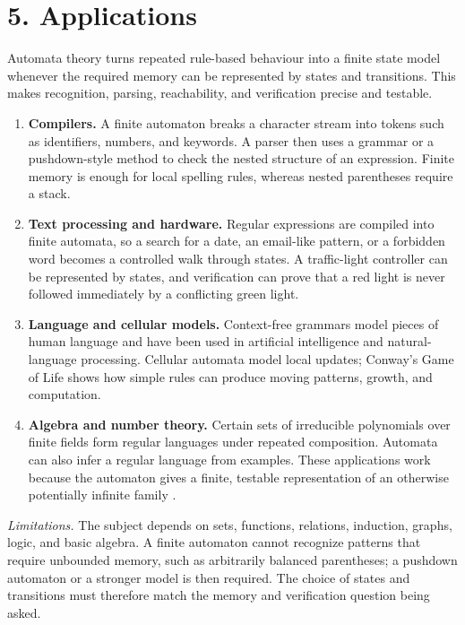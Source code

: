 \section*{5. Applications}
Automata theory turns repeated rule-based behaviour into a finite state model whenever the required memory can be represented by states and transitions. This makes recognition, parsing, reachability, and verification precise and testable.
\begin{enumerate}[leftmargin=*,itemsep=0.35em]
\item \textbf{Compilers.} A finite automaton breaks a character stream into tokens such as identifiers, numbers, and keywords. A parser then uses a grammar or a pushdown-style method to check the nested structure of an expression. Finite memory is enough for local spelling rules, whereas nested parentheses require a stack.
\item \textbf{Text processing and hardware.} Regular expressions are compiled into finite automata, so a search for a date, an email-like pattern, or a forbidden word becomes a controlled walk through states. A traffic-light controller can be represented by states, and verification can prove that a red light is never followed immediately by a conflicting green light.
\item \textbf{Language and cellular models.} Context-free grammars model pieces of human language and have been used in artificial intelligence and natural-language processing. Cellular automata model local updates; Conway's Game of Life shows how simple rules can produce moving patterns, growth, and computation.
\item \textbf{Algebra and number theory.} Certain sets of irreducible polynomials over finite fields form regular languages under repeated composition. Automata can also infer a regular language from examples. These applications work because the automaton gives a finite, testable representation of an otherwise potentially infinite family \cite{automata_theory_ref1,automata_theory_ref7}.
\end{enumerate}

\noindent\emph{Limitations.} The subject depends on sets, functions, relations, induction, graphs, logic, and basic algebra. A finite automaton cannot recognize patterns that require unbounded memory, such as arbitrarily balanced parentheses; a pushdown automaton or a stronger model is then required. The choice of states and transitions must therefore match the memory and verification question being asked.


